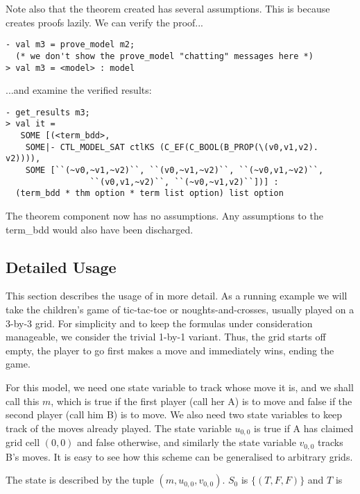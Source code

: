 Note also that the theorem created has several assumptions. This is because \hc{}\, creates proofs lazily. We can verify the proof...
\begin{session}\begin{verbatim}
- val m3 = prove_model m2;
  (* we don't show the prove_model "chatting" messages here *)
> val m3 = <model> : model\end{verbatim}\end{session}
...and examine the verified results:
\begin{session}\begin{verbatim}
- get_results m3;
> val it =
   SOME [(<term_bdd>,
    SOME|- CTL_MODEL_SAT ctlKS (C_EF(C_BOOL(B_PROP(\(v0,v1,v2). v2)))),
    SOME [``(~v0,~v1,~v2)``, ``(v0,~v1,~v2)``, ``(~v0,v1,~v2)``,
                 ``(v0,v1,~v2)``, ``(~v0,~v1,v2)``])] :
  (term_bdd * thm option * term list option) list option
\end{verbatim}\end{session}
The theorem component now has no assumptions. Any assumptions to the term\_bdd would also have been discharged.

\subsection{Detailed Usage}

This section describes the usage of \hc{} in more detail. As a running example we will take the children's game of tic-tac-toe or noughts-and-crosses, usually played on a 3-by-3 grid. For simplicity and to keep the formulas under consideration manageable, we consider the trivial 1-by-1 variant. Thus, the grid starts off empty, the player to go first makes a move and immediately wins, ending the game.

For this model, we need one state variable to track whose move it is, and we shall call this \(m\), which is true if the first player (call her A) is to move and false if the second player (call him B) is to move. We also need two state variables to keep track of the moves already played. The state variable \(u_{0,0}\) is true if A has claimed grid cell \((0,0)\) and false otherwise, and similarly the state variable \(v_{0,0}\) tracks B's moves. It is easy to see how this scheme can be generalised to arbitrary grids.

The state is described by the tuple \( (m,u_{0,0},v_{0,0}) \). \(S_0\) is \( \{ (T,F,F) \} \) and \( T \) is

\begin{eqnarray*}
 [&(&''{u_{0,0}}'',(\lnot u_{0,0} \land \lnot v_{0,0} \land m) \land \lnot((\lnot m \land u_{0,0}) \lor (m \land v_{0,0}))\\
       &&\land (u_{0,0}' \land \lnot m' \land (v_{0,0}' = v_{0,0}))),\\
     &(&''{v_{0,0}}'',(\lnot v_{0,0} \land \lnot u_{0,0} \land \lnot m) \land \lnot((\lnot m \land u_{0,0}) \lor (m \land v_{0,0}))\\
        &&\land (v_{0,0}' \land m' \land (u_{0,0}' = u_{0,0})))]
\end{eqnarray*}

